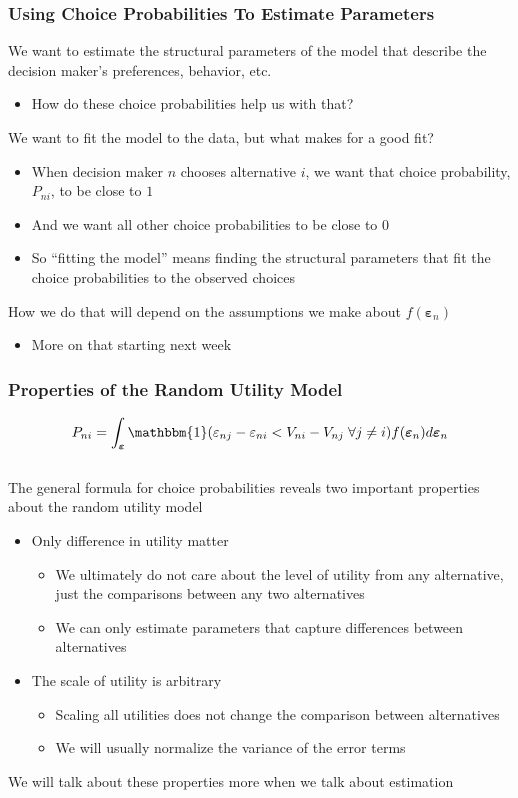 \documentclass{beamer}\usepackage[]{graphicx}\usepackage[]{color}
\begin{document}
\begin{frame}\frametitle{Using Choice Probabilities To Estimate Parameters}    
	We want to estimate the structural parameters of the model that describe the decision maker's preferences, behavior, etc.
	\begin{itemize}
		\item How do these choice probabilities help us with that?
	\end{itemize}
	\vspace{2ex}
	We want to fit the model to the data, but what makes for a good fit?
	\begin{itemize}
		\item When decision maker $n$ chooses alternative $i$, we want that choice probability, $P_{ni}$, to be close to $1$
		\item And we want all other choice probabilities to be close to $0$
		\item So ``fitting the model'' means finding the structural parameters that fit the choice probabilities to the observed choices
	\end{itemize}
	\vspace{2ex}
	How we do that will depend on the assumptions we make about $f(\bm{\varepsilon}_n)$
	\begin{itemize}
		\item More on that starting next week
	\end{itemize}
\end{frame}

\begin{frame}\frametitle{Properties of the Random Utility Model}
	$$P_{ni} = \int_{\bm{\varepsilon}} \mathbbm{1}(\varepsilon_{nj} - \varepsilon_{ni} < V_{ni} - V_{nj} \; \forall j \neq i) f(\bm{\varepsilon}_n) d\bm{\varepsilon}_n$$ \\
	\vspace{2ex}
    The general formula for choice probabilities reveals two important properties about the random utility model
    \begin{itemize}
    	\item Only difference in utility matter
    	\begin{itemize}
    		\item We ultimately do not care about the level of utility from any alternative, just the comparisons between any two alternatives
    		\item We can only estimate parameters that capture differences between alternatives
    	\end{itemize}
    	\item The scale of utility is arbitrary
    	\begin{itemize}
    		\item Scaling all utilities does not change the comparison between alternatives
    		\item We will usually normalize the variance of the error terms 
    	\end{itemize}
    \end{itemize}
    \vspace{2ex}
    We will talk about these properties more when we talk about estimation
\end{frame}
\end{document}
